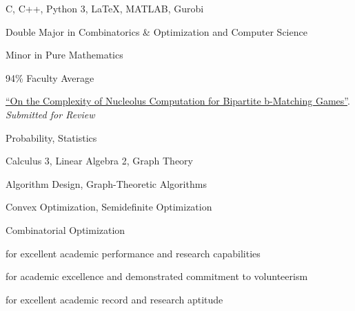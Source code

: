 \small
C, C++, Python 3, \LaTeX, MATLAB, Gurobi

\small
Double Major in Combinatorics \& Optimization and  Computer Science

\smallskip

Minor in Pure Mathematics

\smallskip

94\% Faculty Average

\small
\href{https://arxiv.org/abs/2105.07161}{``On the Complexity of Nucleolus Computation for Bipartite b-Matching Games''}.
\emph{Submitted for Review}

\small
Probability, Statistics

\smallskip

Calculus 3, Linear Algebra 2, Graph Theory

\divider\smallskip

Algorithm Design, Graph-Theoretic Algorithms

\smallskip

Convex Optimization, Semidefinite Optimization

\smallskip

Combinatorial Optimization

\small
{}\small
for excellent academic performance and research capabilities

\divider\smallskip

\small
for academic excellence and demonstrated commitment to volunteerism

\divider\smallskip

\small
for excellent academic record and research aptitude

\divider\smallskip




